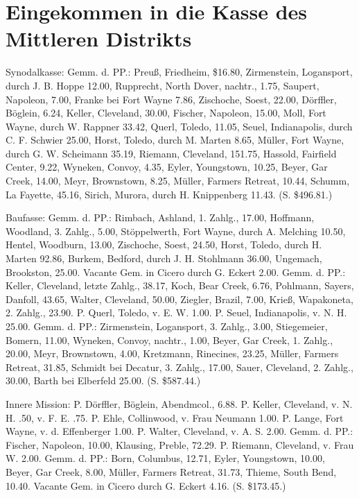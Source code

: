 \chapter[Kasse des Mittleren Distrikts]{Eingekommen in die Kasse des Mittleren Distrikts}

Synodalkasse: Gemm. d. PP.: Preuß, Friedheim, \$16.80, Zirmenstein, Logansport, durch J. B. Hoppe 12.00, Rupprecht, North Dover, nachtr., 1.75, Saupert, Napoleon, 7.00, Franke bei Fort Wayne 7.86, Zischoche, Soest, 22.00, Dörffler, Böglein, 6.24, Keller, Cleveland, 30.00, Fischer, Napoleon, 15.00, Moll, Fort Wayne, durch W. Rappner 33.42, Querl, Toledo, 11.05, Seuel, Indianapolis, durch C. F. Schwier 25.00, Horst, Toledo, durch M. Marten 8.65, Müller, Fort Wayne, durch G. W. Scheimann 35.19, Riemann, Cleveland, 151.75, Hassold, Fairfield Center, 9.22, Wyneken, Convoy, 4.35, Eyler, Youngstown, 10.25, Beyer, Gar Creek, 14.00, Meyr, Brownstown, 8.25, Müller, Farmers Retreat, 10.44, Schumm, La Fayette, 45.16, Sirich, Murora, durch H. Knippenberg 11.43. (S. \$496.81.)

Baufasse: Gemm. d. PP.: Rimbach, Ashland, 1. Zahlg., 17.00, Hoffmann, Woodland, 3. Zahlg., 5.00, Stöppelwerth, Fort Wayne, durch A. Melching 10.50, Hentel, Woodburn, 13.00, Zischoche, Soest, 24.50, Horst, Toledo, durch H. Marten 92.86, Burkem, Bedford, durch J. H. Stohlmann 36.00, Ungemach, Brookston, 25.00. Vacante Gem. in Cicero durch G. Eckert 2.00. Gemm. d. PP.: Keller, Cleveland, letzte Zahlg., 38.17, Koch, Bear Creek, 6.76, Pohlmann, Sayers, Danfoll, 43.65, Walter, Cleveland, 50.00, Ziegler, Brazil, 7.00, Krieß, Wapakoneta, 2. Zahlg., 23.90. P. Querl, Toledo, v. E. W. 1.00. P. Seuel, Indianapolis, v. N. H. 25.00. Gemm. d. PP.: Zirmenstein, Logansport, 3. Zahlg., 3.00, Stiegemeier, Bomern, 11.00, Wyneken, Convoy, nachtr., 1.00, Beyer, Gar Creek, 1. Zahlg., 20.00, Meyr, Brownstown, 4.00, Kretzmann, Rinecines, 23.25, Müller, Farmers Retreat, 31.85, Schmidt bei Decatur, 3. Zahlg., 17.00, Sauer, Cleveland, 2. Zahlg., 30.00, Barth bei Elberfeld 25.00. (S. \$587.44.)

Innere Mission: P. Dörffler, Böglein, Abendmcol., 6.88. P. Keller, Cleveland, v. N. H. .50, v. F. E. .75. P. Ehle, Collinwood, v. Frau Neumann 1.00. P. Lange, Fort Wayne, v. d. Effenberger 1.00. P. Walter, Cleveland, v. A. S. 2.00. Gemm. d. PP.: Fischer, Napoleon, 10.00, Klausing, Preble, 72.29. P. Riemann, Cleveland, v. Frau W. 2.00. Gemm. d. PP.: Born, Columbus, 12.71, Eyler, Youngstown, 10.00, Beyer, Gar Creek, 8.00, Müller, Farmers Retreat, 31.73, Thieme, South Bend, 10.40. Vacante Gem. in Cicero durch G. Eckert 4.16. (S. \$173.45.)

